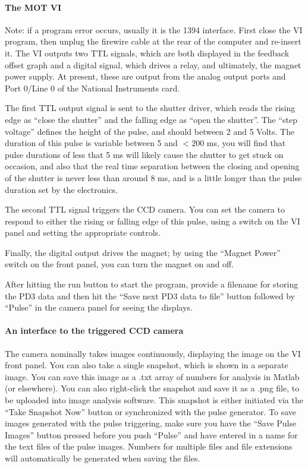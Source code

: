 \documentclass{../lab}
\begin{document}
\paragraph{The MOT VI}

Note: if a program error occurs, usually it is the 1394 interface. First close the VI program, then unplug the firewire cable at the rear of the computer and re-insert it. The VI outputs two TTL signals, which are both displayed in the feedback offset graph and a digital signal, which drives a relay, and ultimately, the magnet power supply. At present, these are output from the analog output ports and Port 0/Line 0 of the National Instruments card.

The first TTL output signal is sent to the shutter driver, which reads the rising edge as ``close the shutter'' and the falling edge as ``open the shutter''. The ``step voltage'' defines the height of the pulse, and should between 2 and 5 Volts. The duration of this pulse is variable between 5 and $<200$ ms, you will find that pulse durations of less that 5 ms will likely cause the shutter to get stuck on occasion, and also that the real time separation between the closing and opening of the shutter is never less than around 8 ms, and is a little longer than the pulse duration set by the electronics.

The second TTL signal triggers the CCD camera. You can set the camera to respond to either the rising or falling edge of this pulse, using a switch on the VI panel and setting the appropriate controls.

Finally, the digital output drives the magnet; by using the ``Magnet Power'' switch on the front panel, you can turn the magnet on and off.

After hitting the run button to start the program, provide a filename for storing the PD3 data and then hit the ``Save next PD3 data to file'' button followed by ``Pulse'' in the camera panel for seeing the displays.

\paragraph{An interface to the triggered CCD camera}
\label{par:InterfaceToTriggeredCCDCamera}

The camera nominally takes images continuously, displaying the image on the VI front panel. You can also take a single snapshot, which is shown in a separate image. You can save this image as a .txt array of numbers for analysis in Matlab (or elsewhere). You can also right-click the snapshot and save it as a .png file, to be uploaded into image analysis software. This snapshot is either initiated via the ``Take Snapshot Now'' button or synchronized with the pulse generator. To save images generated with the pulse triggering, make sure you have the ``Save Pulse Images'' button pressed before you push ``Pulse'' and have entered in a name for the text files of the pulse images. Numbers for multiple files and file extensions will automatically be generated when saving the files.
\end{document}
